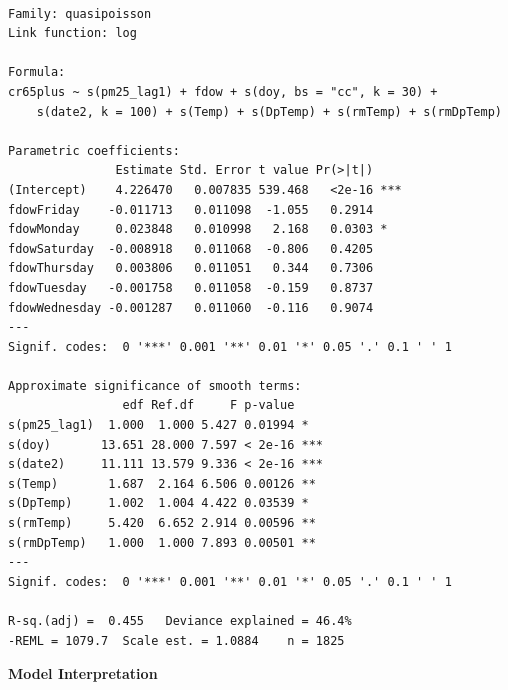 \documentclass[
  letterpaper,
  DIV=11,
  numbers=noendperiod]{scrreprt}
\begin{document}
\begin{verbatim}

Family: quasipoisson 
Link function: log 

Formula:
cr65plus ~ s(pm25_lag1) + fdow + s(doy, bs = "cc", k = 30) + 
    s(date2, k = 100) + s(Temp) + s(DpTemp) + s(rmTemp) + s(rmDpTemp)

Parametric coefficients:
               Estimate Std. Error t value Pr(>|t|)    
(Intercept)    4.226470   0.007835 539.468   <2e-16 ***
fdowFriday    -0.011713   0.011098  -1.055   0.2914    
fdowMonday     0.023848   0.010998   2.168   0.0303 *  
fdowSaturday  -0.008918   0.011068  -0.806   0.4205    
fdowThursday   0.003806   0.011051   0.344   0.7306    
fdowTuesday   -0.001758   0.011058  -0.159   0.8737    
fdowWednesday -0.001287   0.011060  -0.116   0.9074    
---
Signif. codes:  0 '***' 0.001 '**' 0.01 '*' 0.05 '.' 0.1 ' ' 1

Approximate significance of smooth terms:
                edf Ref.df     F p-value    
s(pm25_lag1)  1.000  1.000 5.427 0.01994 *  
s(doy)       13.651 28.000 7.597 < 2e-16 ***
s(date2)     11.111 13.579 9.336 < 2e-16 ***
s(Temp)       1.687  2.164 6.506 0.00126 ** 
s(DpTemp)     1.002  1.004 4.422 0.03539 *  
s(rmTemp)     5.420  6.652 2.914 0.00596 ** 
s(rmDpTemp)   1.000  1.000 7.893 0.00501 ** 
---
Signif. codes:  0 '***' 0.001 '**' 0.01 '*' 0.05 '.' 0.1 ' ' 1

R-sq.(adj) =  0.455   Deviance explained = 46.4%
-REML = 1079.7  Scale est. = 1.0884    n = 1825
\end{verbatim}

\textbf{Model Interpretation}
\end{document}
